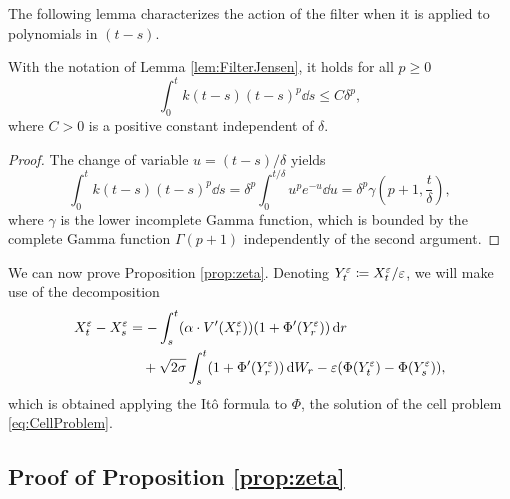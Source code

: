 \documentclass[10pt]{article}
\begin{document}
\begin{appendices}
The following lemma characterizes the action of the filter when it is applied to polynomials in $(t-s)$.
\begin{lemma}\label{lem:FilterPoly} With the notation of Lemma \ref{lem:FilterJensen}, it holds for all $p \geq 0$
	\begin{equation}
		\int_0^t k(t-s)(t-s)^p \dd s \leq C \delta^p,
	\end{equation}
	where $C > 0$ is a positive constant independent of $\delta$.
\end{lemma}
\begin{proof} The change of variable $u = (t-s)/\delta$ yields
	\begin{equation}
		\int_0^t k(t-s)(t-s)^p \dd s = \delta^p \int_0^{t/\delta} u^p e^{-u} \dd u = \delta^p \gamma\left(p+1, \frac{t}{\delta}\right),
	\end{equation}
	where $\gamma$ is the lower incomplete Gamma function, which is bounded by the complete Gamma function $\Gamma(p+1)$ independently of the second argument.
\end{proof}


We can now prove Proposition \ref{prop:zeta}. Denoting $Y_t^\varepsilon \coloneqq X_t^\varepsilon/\varepsilon$, we will make use of the decomposition
\cite[Formula 5.8]{PaS07}
\begin{equation}\label{eq:App_DiffXtXs}
\begin{aligned}
	X_t^\varepsilon - X_s^\varepsilon &= -\int_s^t (\alpha \cdot V'(X_r^\varepsilon))(1 + \Phi'(Y^\varepsilon_r)) \,\mathrm{d} r\\
	&\quad +\sqrt{2\sigma} \int_s^t (1 + \Phi'(Y_r^\varepsilon)) \,\mathrm{d} W_r - \varepsilon(\Phi(Y^\varepsilon_t)-\Phi(Y^\varepsilon_s)),
\end{aligned}
\end{equation}
which is obtained applying the Itô formula to $\Phi$, the solution of the cell problem \eqref{eq:CellProblem}. 

\subsection{Proof of Proposition \ref{prop:zeta}}


\end{appendices}
\end{document}
